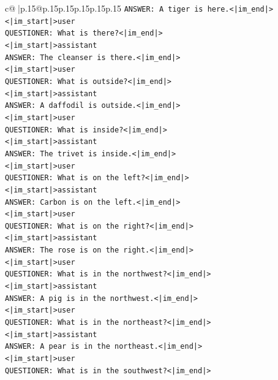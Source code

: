 \documentclass{article}
\begin{document}
{\begin{supertabular}{c@{$\;$}|p{.15\linewidth}@{}p{.15\linewidth}p{.15\linewidth}p{.15\linewidth}p{.15\linewidth}p{.15\linewidth}}
{{{\texttt{ANSWER: A tiger is here.<|im\_end|>} \\
\texttt{<|im\_start|>user} \\
\texttt{QUESTIONER: What is there?<|im\_end|>} \\
\texttt{<|im\_start|>assistant} \\
\texttt{ANSWER: The cleanser is there.<|im\_end|>} \\
\texttt{<|im\_start|>user} \\
\texttt{QUESTIONER: What is outside?<|im\_end|>} \\
\texttt{<|im\_start|>assistant} \\
\texttt{ANSWER: A daffodil is outside.<|im\_end|>} \\
\texttt{<|im\_start|>user} \\
\texttt{QUESTIONER: What is inside?<|im\_end|>} \\
\texttt{<|im\_start|>assistant} \\
\texttt{ANSWER: The trivet is inside.<|im\_end|>} \\
\texttt{<|im\_start|>user} \\
\texttt{QUESTIONER: What is on the left?<|im\_end|>} \\
\texttt{<|im\_start|>assistant} \\
\texttt{ANSWER: Carbon is on the left.<|im\_end|>} \\
\texttt{<|im\_start|>user} \\
\texttt{QUESTIONER: What is on the right?<|im\_end|>} \\
\texttt{<|im\_start|>assistant} \\
\texttt{ANSWER: The rose is on the right.<|im\_end|>} \\
\texttt{<|im\_start|>user} \\
\texttt{QUESTIONER: What is in the northwest?<|im\_end|>} \\
\texttt{<|im\_start|>assistant} \\
\texttt{ANSWER: A pig is in the northwest.<|im\_end|>} \\
\texttt{<|im\_start|>user} \\
\texttt{QUESTIONER: What is in the northeast?<|im\_end|>} \\
\texttt{<|im\_start|>assistant} \\
\texttt{ANSWER: A pear is in the northeast.<|im\_end|>} \\
\texttt{<|im\_start|>user} \\
\texttt{QUESTIONER: What is in the southwest?<|im\_end|>} \\
}}}
\end{supertabular}}
\end{document}
